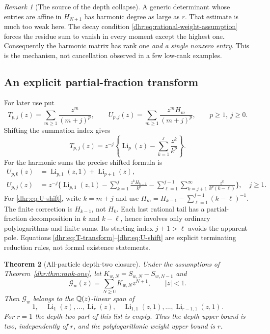 \documentclass[11pt,letterpaper]{article}
\numberwithin{equation}{section}
\newtheorem{theorem}{Theorem}[section]
\theoremstyle{definition}\newtheorem{definition}[theorem]{Definition}
\theoremstyle{remark}\newtheorem{remark}[theorem]{Remark}
\DeclareMathOperator{\Li}{Li}
\begin{document}
\begin{remark}[The source of the depth collapse]
A generic determinant whose entries are affine in $H_{N+1}$ has
harmonic degree as large as $r$. That estimate is much too weak here.
The decay condition \eqref{dhr:eq:rational-weight-assumption} forces
the residue sum to vanish in every moment except the highest one.
Consequently the harmonic matrix has rank one \emph{and a single
nonzero entry}. This is the mechanism, not cancellation observed in
a few low-rank examples.
\end{remark}

\subsection{An explicit partial-fraction transform}
For later use put
\[
 T_{p,j}(z)=\sum_{m\geq1}\frac{z^m}{(m+j)^p},\qquad
 U_{p,j}(z)=\sum_{m\geq1}\frac{z^mH_m}{(m+j)^p},
 \qquad p\geq1,\ j\geq0.
\]
Shifting the summation index gives
\begin{equation}\label{dhr:eq:T-transform}
 T_{p,j}(z)=z^{-j}\left\{\Li_p(z)-
                    \sum_{k=1}^j\frac{z^k}{k^p}\right\}.
\end{equation}
For the harmonic sums the precise shifted formula is
\begin{align}
 U_{p,0}(z)&=\Li_{p,1}(z,1)+\Li_{p+1}(z),
 \label{dhr:eq:U-zero}\\
 U_{p,j}(z)&=z^{-j}\bigg\{\Li_{p,1}(z,1)
 -\sum_{k=1}^j\frac{z^kH_{k-1}}{k^p}
 -\sum_{\ell=1}^{j-1}\sum_{k=j+1}^{\infty}
             \frac{z^k}{k^p(k-\ell)}\bigg\},\quad j\geq1.
 \label{dhr:eq:U-shift}
\end{align}
For \eqref{dhr:eq:U-shift}, write $k=m+j$ and use
$H_m=H_{k-1}-\sum_{\ell=1}^{j-1}(k-\ell)^{-1}$.
The finite correction is $H_{k-1}$, not $H_k$.
Each last rational tail has a partial-fraction decomposition in
$k$ and $k-\ell$, hence involves only ordinary polylogarithms and
finite sums. Its starting index $j+1>\ell$ avoids the apparent pole.
Equations \eqref{dhr:eq:T-transform}--\eqref{dhr:eq:U-shift} are
explicit terminating reduction rules, not formal existence statements.

\begin{theorem}[All-particle depth-two closure]\label{dhr:thm:closure}
Under the assumptions of Theorem~\ref{dhr:thm:rank-one}, let
$K_{w,N}=S_{w,N}-S_{w,N-1}$ and
\begin{equation}\label{dhr:eq:general-generating}
 \mathcal G_w(z)=\sum_{N\geq0}K_{w,N}z^{N+1},\qquad |z|<1.
\end{equation}
Then $\mathcal G_w$ belongs to the $\mathbb Q(z)$-linear span of
\begin{equation}\label{dhr:eq:closure-space}
 1,\quad \Li_1(z),\ldots,\Li_r(z),\quad
 \Li_{1,1}(z,1),\ldots,\Li_{r-1,1}(z,1).
\end{equation}
For $r=1$ the depth-two part of this list is empty. Thus the depth
upper bound is two, independently of $r$, and the polylogarithmic
weight upper bound is $r$.
\end{theorem}
\end{document}
